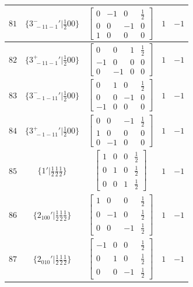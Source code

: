 \documentclass[fleqn,8pt]{jsarticle}
\begin{document}
\begin{longtable}{ccccc}
$ 81 $ & $ \{3^{-}_{\,\,-11-1}{}'|\frac{1}{2} 0 0\} $ & $ \begin{bmatrix} 0 & -1 & 0 & \frac{1}{2} \\ 0 & 0 & -1 & 0 \\ 1 & 0 & 0 & 0 \end{bmatrix} $ & $ 1 $ & $ -1 $ \\ \hline
$ 82 $ & $ \{3^{+}_{\,\,-11-1}{}'|\frac{1}{2} 0 0\} $ & $ \begin{bmatrix} 0 & 0 & 1 & \frac{1}{2} \\ -1 & 0 & 0 & 0 \\ 0 & -1 & 0 & 0 \end{bmatrix} $ & $ 1 $ & $ -1 $ \\ \hline
$ 83 $ & $ \{3^{-}_{\,\,-1-11}{}'|\frac{1}{2} 0 0\} $ & $ \begin{bmatrix} 0 & 1 & 0 & \frac{1}{2} \\ 0 & 0 & -1 & 0 \\ -1 & 0 & 0 & 0 \end{bmatrix} $ & $ 1 $ & $ -1 $ \\ \hline
$ 84 $ & $ \{3^{+}_{\,\,-1-11}{}'|\frac{1}{2} 0 0\} $ & $ \begin{bmatrix} 0 & 0 & -1 & \frac{1}{2} \\ 1 & 0 & 0 & 0 \\ 0 & -1 & 0 & 0 \end{bmatrix} $ & $ 1 $ & $ -1 $ \\ \hline
$ 85 $ & $ \{1{}'|\frac{1}{2} \frac{1}{2} \frac{1}{2}\} $ & $ \begin{bmatrix} 1 & 0 & 0 & \frac{1}{2} \\ 0 & 1 & 0 & \frac{1}{2} \\ 0 & 0 & 1 & \frac{1}{2} \end{bmatrix} $ & $ 1 $ & $ -1 $ \\ \hline
$ 86 $ & $ \{2{}_{100}{}'|\frac{1}{2} \frac{1}{2} \frac{1}{2}\} $ & $ \begin{bmatrix} 1 & 0 & 0 & \frac{1}{2} \\ 0 & -1 & 0 & \frac{1}{2} \\ 0 & 0 & -1 & \frac{1}{2} \end{bmatrix} $ & $ 1 $ & $ -1 $ \\ \hline
$ 87 $ & $ \{2{}_{010}{}'|\frac{1}{2} \frac{1}{2} \frac{1}{2}\} $ & $ \begin{bmatrix} -1 & 0 & 0 & \frac{1}{2} \\ 0 & 1 & 0 & \frac{1}{2} \\ 0 & 0 & -1 & \frac{1}{2} \end{bmatrix} $ & $ 1 $ & $ -1 $ \\ \hline

\end{longtable}
\end{document}
